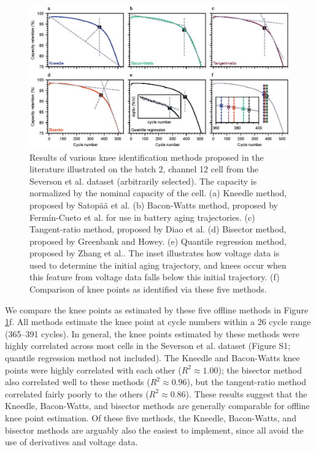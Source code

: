 \documentclass[journal=jpclcd,manuscript=article]{achemso}
\begin{document}
\begin{figure}[h!tb]
\centering
\includegraphics[scale=1]{figures/knee_identification_methods.eps}
\caption{Results of various knee identification methods proposed in the literature illustrated on the batch 2, channel 12 cell from the Severson et al.\cite{severson_data-driven_2019} dataset (arbitrarily selected). The capacity is normalized by the nominal capacity of the cell.
(a) Kneedle method, proposed by Satop{\"a}{\"a} et al.\cite{satopaa_finding_2011}
(b) Bacon-Watts method, proposed by Fermín-Cueto et al. \cite{fermin-cueto_identification_2020} for use in battery aging trajectories.
(c) Tangent-ratio method, proposed by Diao et al.\cite{diao_algorithm_2019}
(d) Bisector method, proposed by Greenbank and Howey.\cite{greenbank_automated_2021}
(e) Quantile regression method, proposed by Zhang et al.\cite{zhang_accelerated_2019}.
The inset illustrates how voltage data is used to determine the initial aging trajectory, and knees occur when this feature from voltage data falls below this initial trajectory.
(f) Comparison of knee points as identified via these five methods.}
\label{fig:knee_identification_methods}
\end{figure}

We compare the knee points as estimated by these five offline methods in Figure \ref{fig:knee_identification_methods}f.
All methods estimate the knee point at cycle numbers within a 26 cycle range (365--391 cycles). 
In general, the knee points estimated by these methods were highly correlated across most cells in the Severson et al.\cite{severson_data-driven_2019} dataset (Figure S1; quantile regression method not included).
The Kneedle and Bacon-Watts knee points were highly correlated with each other ($R^2\approx 1.00$); the bisector method also correlated well to these methods ($R^2\approx 0.96$), but the tangent-ratio method correlated fairly poorly to the others ($R^2\approx 0.86$).
These results suggest that the Kneedle, Bacon-Watts, and bisector methods are generally comparable for offline knee point estimation.
Of these five methods, the Kneedle, Bacon-Watts, and bisector methods are arguably also the easiest to implement, since all avoid the use of derivatives and voltage data.
\end{document}
